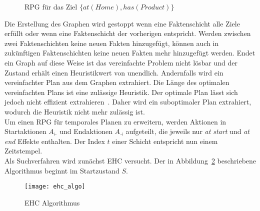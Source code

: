 \begin{figure}[ht!]
    \caption{\ac{RPG} für das Ziel $\{at(Home), has(Product)\}$}
    \label{fig:rpg}
\end{figure}
Die Erstellung des Graphen wird gestoppt wenn eine Faktenschicht alle Ziele erfüllt oder wenn eine Faktenschicht der vorherigen entspricht.
Werden zwischen zwei Faktenschichten keine neuen Fakten hinzugefügt, können auch in zukünftigen Faktenschichten keine neuen Fakten mehr hinzugefügt werden.
Endet ein Graph auf diese Weise ist das vereinfachte Problem nicht lösbar und der Zustand erhält einen Heuristikwert von unendlich.
Andernfalls wird ein vereinfachter Plan aus dem Graphen extrahiert.
Die Länge des optimalen vereinfachten Plans ist eine zulässige Heuristik.
Der optimale Plan lässt sich jedoch nicht effizient extrahieren~\cite{hoffmannnebel2001}.
Daher wird ein suboptimaler Plan extrahiert, wodurch die Heuristik nicht mehr zulässig ist.\\
Um einen \ac{RPG} für temporales Planen zu erweitern, werden Aktionen in Startaktionen $A_\vdash$ und Endaktionen $A_\dashv$ aufgeteilt, die jeweils nur \emph{at start} und \emph{at end} Effekte enthalten.
Der Index $t$ einer Schicht entspricht nun einem Zeitstempel.\\
Als Suchverfahren wird zunächst \ac{EHC} versucht.
Der in Abbildung~\ref{fig:ehc_algo} beschriebene Algorithmus beginnt im Startzustand $S$.
\begin{figure}[h!]
           \centering
           \texttt{[image: ehc\_algo]}
           \caption{\ac{EHC} Algorithmus~\cite{hoffmannnebel2001}}
           \label{fig:ehc_algo}
\end{figure}
